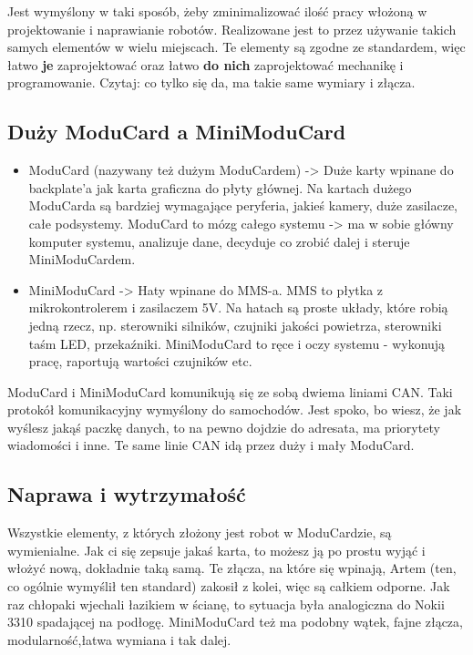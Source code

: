 \documentclass[b5paper, 10pt, twoside]{book}
\begin{document}
Jest wymyślony w taki sposób, żeby zminimalizować ilość pracy włożoną w projektowanie i naprawianie robotów. Realizowane jest to przez używanie takich samych elementów w wielu miejscach. Te elementy są zgodne ze standardem, więc łatwo \textbf{je} zaprojektować oraz łatwo \textbf{do nich} zaprojektować mechanikę i programowanie. Czytaj: co tylko się da, ma takie same wymiary i złącza.

\subsection{Duży ModuCard a MiniModuCard}
\begin{itemize}
  \item ModuCard (nazywany też dużym ModuCardem) -> Duże karty wpinane do backplate'a jak karta graficzna do płyty głównej. Na kartach dużego ModuCarda są bardziej wymagające peryferia, jakieś kamery, duże zasilacze, całe podsystemy. ModuCard to mózg całego systemu -> ma w sobie główny komputer systemu, analizuje dane, decyduje co zrobić dalej i steruje MiniModuCardem.
  \item MiniModuCard -> Haty wpinane do MMS-a. MMS to płytka z mikrokontrolerem i zasilaczem 5V. Na hatach są proste układy, które robią jedną rzecz, np. sterowniki silników, czujniki jakości powietrza, sterowniki taśm LED, przekaźniki. MiniModuCard to ręce i oczy systemu - wykonują pracę, raportują wartości czujników etc.
\end{itemize}



ModuCard i MiniModuCard komunikują się ze sobą dwiema liniami CAN. Taki protokół komunikacyjny wymyślony do samochodów. Jest spoko, bo wiesz, że jak wyślesz jakąś paczkę danych, to na pewno dojdzie do adresata, ma priorytety wiadomości i inne. Te same linie CAN idą przez duży i mały ModuCard. 

\subsection{Naprawa i wytrzymałość}

Wszystkie elementy, z których złożony jest robot w ModuCardzie, są wymienialne. Jak ci się zepsuje jakaś karta, to możesz ją po prostu wyjąć i włożyć nową, dokładnie taką samą. Te złącza, na które się wpinają, Artem (ten, co ogólnie wymyślił ten standard) zakosił z kolei, więc są całkiem odporne. Jak raz chłopaki
wjechali łazikiem w ścianę, to sytuacja była analogiczna do Nokii 3310 spadającej na podłogę. MiniModuCard też ma podobny wątek, fajne złącza, modularność,łatwa wymiana i tak dalej.
\end{document}

